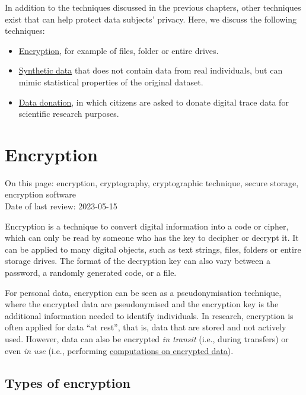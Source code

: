\documentclass[
]{book}
\providecommand{\tightlist}{%
  \setlength{\itemsep}{0pt}\setlength{\parskip}{0pt}}
\begin{document}
In addition to the techniques discussed in the previous chapters, other
techniques exist that can help protect data subjects' privacy. Here, we discuss
the following techniques:

\begin{itemize}
\tightlist
\item
  \protect\hyperlink{encryption}{Encryption}, for example of files, folder or entire drives.
\item
  \protect\hyperlink{synthetic-data}{Synthetic data} that does not contain data from real
  individuals, but can mimic statistical properties of the original dataset.
\item
  \protect\hyperlink{data-donation}{Data donation}, in which citizens are asked to donate digital
  trace data for scientific research purposes.
\end{itemize}

\hypertarget{encryption}{%
\section{Encryption}\label{encryption}}

On this page: encryption, cryptography, cryptographic technique, secure storage,
encryption software\\
Date of last review: 2023-05-15

Encryption is a technique to convert digital information into a code or cipher,
which can only be read by someone who has the key to decipher or decrypt it. It
can be applied to many digital objects, such as text strings, files, folders or
entire storage drives. The format of the decryption key can also vary between a
password, a randomly generated code, or a file.

For personal data, encryption can be seen as a pseudonymisation technique, where
the encrypted data are pseudonymised and the encryption key is the additional
information needed to identify individuals. In research, encryption is often
applied for data ``at rest'', that is, data that are stored and not actively used.
However, data can also be encrypted \emph{in transit} (i.e., during transfers) or
even \emph{in use} (i.e., performing \protect\hyperlink{homomorphic-encryption}{computations on encrypted data}).

\hypertarget{encryption-types}{%
\subsection{Types of encryption}\label{encryption-types}}
\end{document}
